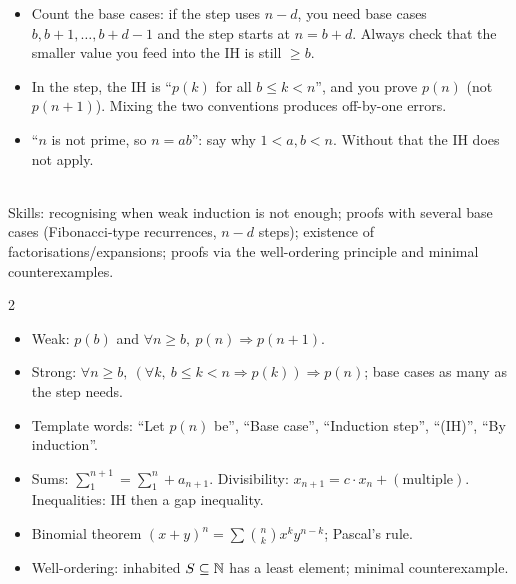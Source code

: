 \begin{warn}
\begin{itemize}
\item Count the base cases: if the step uses $n-d$, you need base cases $b,b+1,\dots,b+d-1$ and the step starts at $n=b+d$. Always check that the smaller value you feed into the IH is still $\ge b$.
\item In the step, the IH is ``$p(k)$ for all $b\le k<n$'', and you prove $p(n)$ (not $p(n+1)$). Mixing the two conventions produces off-by-one errors.
\item ``$n$ is not prime, so $n=ab$'': say why $1<a,b<n$. Without that the IH does not apply.
\end{itemize}
\end{warn}

\begin{planning}
\quad {}\\[3pt]
Skills: recognising when weak induction is not enough; proofs with several base cases (Fibonacci-type recurrences, $n-d$ steps); existence of factorisations/expansions; proofs via the well-ordering principle and minimal counterexamples.
\end{planning}

\begin{multicols}{2}\small
\begin{itemize}
\item Weak: $p(b)$ and $\forall n\ge b,\ p(n)\Rightarrow p(n+1)$.
\item Strong: $\forall n\ge b,\ (\forall k,\ b\le k<n\Rightarrow p(k))\Rightarrow p(n)$; base cases as many as the step needs.
\item Template words: ``Let $p(n)$ be'', ``Base case'', ``Induction step'', ``(IH)'', ``By induction''.
\item Sums: $\sum_{1}^{n+1}=\sum_1^n+a_{n+1}$. Divisibility: $x_{n+1}=c\cdot x_n+(\text{multiple})$. Inequalities: IH then a gap inequality.
\item Binomial theorem $(x+y)^n=\sum\binom nkx^ky^{n-k}$; Pascal's rule.
\item Well-ordering: inhabited $S\subseteq\mathbb{N}$ has a least element; minimal counterexample.
\end{itemize}
\end{multicols}
